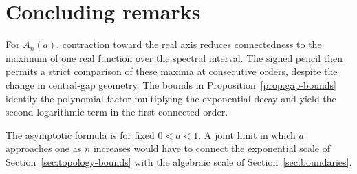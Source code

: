 \documentclass[preprints,article,accept,oneauthor]{Definitions/mdpi}
\numberwithin{equation}{section}
\theoremstyle{mdpi}
\theoremstyle{definition}
\begin{document}
\section{Concluding remarks}

For \(A_n(a)\), contraction toward the real axis reduces connectedness to
the maximum of one real function over the spectral interval.  The signed
pencil then permits a strict comparison of these maxima at consecutive
orders, despite the change in central-gap geometry.  The bounds in
Proposition~\ref{prop:gap-bounds} identify the polynomial factor multiplying
the exponential decay and yield the second logarithmic term in the
first connected order.

The asymptotic formula is for fixed \(0<a<1\).  A joint limit in which
\(a\) approaches one as \(n\) increases would have to connect the
exponential scale of Section~\ref{sec:topology-bounds} with the algebraic
scale of Section~\ref{sec:boundaries}.



\end{document}

